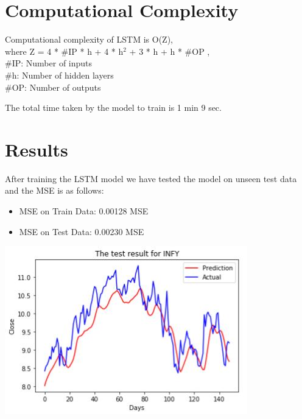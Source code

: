 \section{Computational Complexity}

Computational complexity of LSTM is O(Z),\\
  where Z = 4 * \#IP * h + 4 * h$^{2}$ + 3 * h + h * \#OP , \\
 \tab\#IP: Number of inputs\\
 \tab\#h: Number of hidden layers\\
 \tab\#OP: Number of outputs

The total time taken by the model to train is 1 min 9 sec.

\section{Results}
After training the LSTM model we have tested the model on unseen test data and the MSE is as follows:
\begin{itemize}
\item MSE on Train Data: 0.00128 MSE
\item MSE on Test Data: 0.00230 MSE
\end{itemize}
 


				\begin{center}
				\includegraphics[width=\linewidth]{figures/test-data-results.jpg}	
				\label{fig: Plot showing of Actual and Predicted values}
				\end{center}

